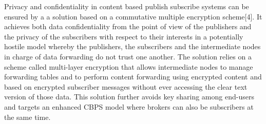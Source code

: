 \documentclass[MTech]{iitmdiss}
\begin{document}
Privacy and confidentiality in content based publish subscribe systems can be ensured by  a  a solution based on a commutative multiple encryption scheme[4]. It achieves both data confidentiality from the point of view of the publishers and the privacy of
the subscribers with respect to their interests in a potentially hostile model whereby the publishers, the subscribers and the intermediate nodes in charge of data forwarding do not trust one another. The solution relies on a scheme called multi-layer encryption that allows intermediate nodes to manage forwarding tables and to perform content forwarding using encrypted content and based on encrypted subscriber messages without ever accessing the clear text version of those data. This solution further avoids key sharing among end-users and targets an enhanced CBPS model where brokers can also be subscribers at the same time.
\pagebreak
\end{document}
